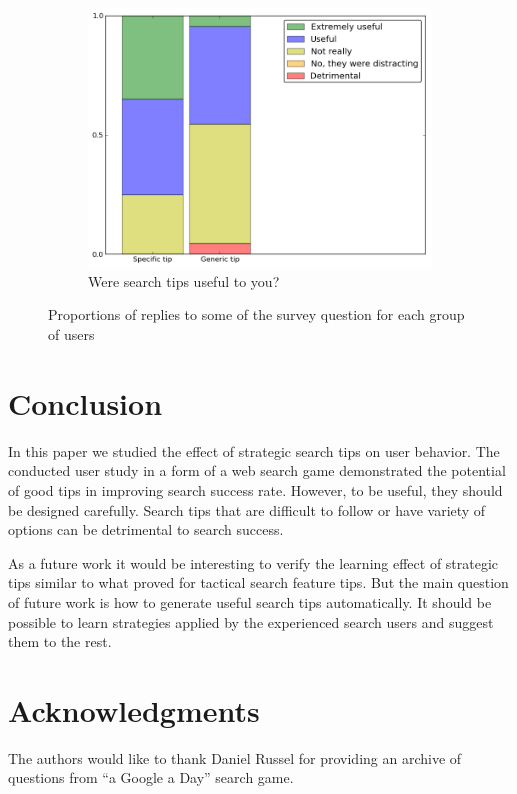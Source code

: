 \documentclass{sig-alternate}
\begin{document}
\begin{figure}[ht]
\begin{subfigure}[t]{0.3\textwidth}
	\includegraphics[scale=0.26]{img/useful}
	\caption{Were search tips useful to you?}
    \label{figure:survey:useful}
\end{subfigure}
\caption{Proportions of replies to some of the survey question for each group of users}
\label{figure:survey}
\end{figure}

\section{Conclusion}
In this paper we studied the effect of strategic search tips on user behavior.
The conducted user study in a form of a web search game demonstrated the potential of good tips in improving search success rate.
However, to be useful, they should be designed carefully.
Search tips that are difficult to follow or have variety of options can be detrimental to search success.

As a future work it would be interesting to verify the learning effect of strategic tips similar to what \cite{Moraveji:2011:MIU:2009916.2009966} proved for tactical search feature tips.
But the main question of future work is how to generate useful search tips automatically.
It should be possible to learn strategies applied by the experienced search users and suggest them to the rest.

\section{Acknowledgments}
The authors would like to thank Daniel Russel for providing an archive of questions from ``a Google a Day'' search game.

%

%
%
\end{document}
